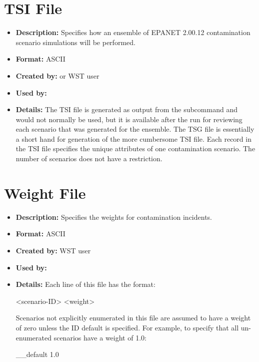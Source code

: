\section{TSI File}\label{formats_tsiFile} 
\begin{itemize} 
\item {\bfseries Description:} Specifies how an ensemble of EPANET 2.00.12 contamination scenario simulations will be performed. 
\item {\bfseries Format:} ASCII 
\item {\bfseries Created by:}  or WST user 
\item {\bfseries Used by:}  
\item {\bfseries Details:} The TSI file is generated as output from the  subcommand 
and would not normally be used, but it is available after the run for reviewing each scenario 
that was generated for the ensemble. The TSG file is essentially a short hand for generation of 
the more cumbersome TSI file. Each record in the TSI file specifies the unique attributes 
of one contamination scenario. The number of scenarios does not have a restriction.                         
\end{itemize} 


\section{Weight File}\label{formats_weightFile}
\begin{itemize}
\item {\bfseries Description:} Specifies the weights for contamination incidents.
\item {\bfseries Format:} ASCII 
\item {\bfseries Created by:} WST user 
\item {\bfseries Used by:}  
\item {\bfseries Details:} Each line of this file has the format:
\begin{unknownListing}
   <scenario-ID> <weight>
\end{unknownListing}
Scenarios not explicitly enumerated in this file are assumed to have a weight of zero unless 
the ID \code{\_\_}default is specified. For example, to specify that all un-\/enumerated 
scenarios have a weight of 1.0:
\begin{unknownListing}
   __default 1.0
\end{unknownListing}
\end{itemize}




